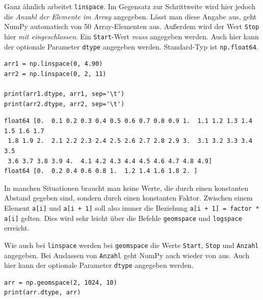 Ganz ähnlich arbeitet \texttt{linspace}. Im Gegensatz zur Schrittweite wird hier jedoch die \emph{Anzahl der Elemente im Array} angegeben. Lässt man diese Angabe aus, geht NumPy automatisch von 50 Array-Elementen aus. Außerdem wird der Wert \texttt{Stop} hier \emph{mit eingeschlossen}. Ein \texttt{Start}-Wert \emph{muss} angegeben werden. Auch hier kann der optionale Parameter \texttt{dtype} angegeben werden. Standard-Typ ist \texttt{np.float64}.

\begin{codebox}
\begin{verbatim}
arr1 = np.linspace(0, 4.90)
arr2 = np.linspace(0, 2, 11)

print(arr1.dtype, arr1, sep='\t')
print(arr2.dtype, arr2, sep='\t')
\end{verbatim}
\end{codebox}

\begin{cmdbox}
\begin{verbatim}
float64 [0.  0.1 0.2 0.3 0.4 0.5 0.6 0.7 0.8 0.9 1.  1.1 1.2 1.3 1.4 1.5 1.6 1.7
 1.8 1.9 2.  2.1 2.2 2.3 2.4 2.5 2.6 2.7 2.8 2.9 3.  3.1 3.2 3.3 3.4 3.5
 3.6 3.7 3.8 3.9 4.  4.1 4.2 4.3 4.4 4.5 4.6 4.7 4.8 4.9]
float64 [0.  0.2 0.4 0.6 0.8 1.  1.2 1.4 1.6 1.8 2. ]
\end{verbatim}
\end{cmdbox}

In manchen Situationen braucht man keine Werte, die durch einen konstanten Abstand gegeben sind, sondern durch einen konstanten Faktor. Zwischen einem Element \texttt{a[i]} und \texttt{a[i + 1]} soll also immer die Beziehung \texttt{a[i + 1] = factor * a[i]} gelten. Dies wird sehr leicht über die Befehle \texttt{geomspace} und \texttt{logspace} erreicht.

Wie auch bei \texttt{linspace} werden bei \texttt{geomspace} die Werte \texttt{Start}, \texttt{Stop} und \texttt{Anzahl} angegeben. Bei Auslassen von \texttt{Anzahl} geht NumPy auch wieder von  aus. Auch hier kann der optionale Parameter \texttt{dtype} angegeben werden.

\begin{codebox}
\begin{verbatim}
arr = np.geomspace(2, 1024, 10)
print(arr.dtype, arr)
\end{verbatim}
\end{codebox}

